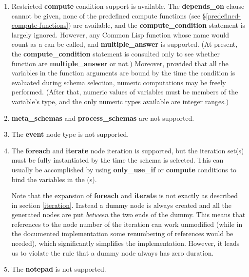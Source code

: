 \begin{enumerate}
\item Restricted {\bf compute} condition support is available.
The {\bf depends\_on} clause cannot be given, none of the
predefined compute functions (see \S\ref{predefined-compute-functions})
are available, and the {\bf compute\_condition} statement is 
largely ignored.  However, any Common Lisp function whose name
would count as a  can be called, and {\bf multiple\_answer}
is supported.  (At present, the {\bf compute\_condition} statement
is consulted only to see whether function are {\bf multiple\_answer}
or not.)  Moreover, provided that all the variables in the function
arguments are bound by the time the condition is evaluated during
schema selection, numeric computations may be freely performed.
(After that, numeric values of variables must be members of the
variable's type, and the only numeric types available are integer
ranges.)

\item {\bf meta\_schemas} and {\bf process\_schemas} are not supported. 

\item The {\bf event} node type is not supported.

\item The {\bf foreach} and {\bf iterate} node iteration is supported,
but the iteration set(s) must be fully instantiated by the time the
schema is selected.  This can usually be accomplished by using
{\bf only\_use\_if} or {\bf compute} conditions to bind the
variables in the (s).

Note that the expansion of {\bf foreach} and {\bf iterate} is not
exactly as described in section \ref{iteration}.  Instead a dummy
node is always created and all the generated nodes are put {\em between}
the two ends of the dummy.  This means that references to the node
number of the iteration can work unmodified (while in the documented
implementation some renumbering of references would be needed), which
significantly simplifies the implementation.  However, it leads us to
violate the rule that a dummy node always has zero duration.

\item The {\bf notepad} is not supported.


\end{enumerate}
